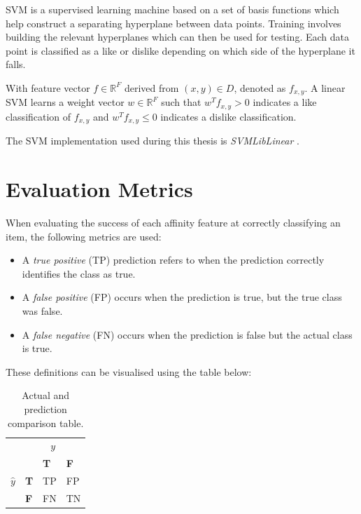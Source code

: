 SVM is a supervised learning machine based on a set of basis functions which help construct 
a separating hyperplane between data points. Training involves building the relevant hyperplanes which can then be used for testing. 
Each data point is classified as a like or dislike depending on which side of the hyperplane it falls.

With feature vector $f \in \mathbb{R}^F$ derived from $(x,y) \in D$, denoted as $f_{x,y}$. A linear SVM learns a weight vector $w \in \mathbb{R}^F$
such that $w^T f_{x,y} > 0$ indicates a like classification of $f_{x,y}$ and $w^T f_{x,y} \leq 0$ indicates a dislike classification.

The SVM implementation used during this thesis is \emph{SVMLibLinear} \cite{cjlin}.

\section{Evaluation Metrics}
\label{sec:notation}

When evaluating the success of each affinity feature at correctly classifying an item, the following metrics are used:

\begin{itemize}
\item A \emph{true positive} (TP) prediction refers to when the prediction correctly identifies the class as true. 
\item A \emph{false positive} (FP) occurs when the prediction is true, but the true class was false.
\item A \emph{false negative} (FN) occurs when the prediction is false but the actual class is true.
\end{itemize}

These definitions can be visualised using the table below:

\begin{table}[tbh!]
\centering
\begin{tabular}{r|l|l|l|}
\multicolumn{1}{r}{}
 &  \multicolumn{3}{c}{$y$} \\
 \cline{2-4}
& & \textbf{T} & \textbf{F} \\ 
\cline{2-4}
$\hat{y}$ & \textbf{T} & TP & FP \\
\cline{2-4}
& \textbf{F} & FN & TN \\
\cline{2-4}
\end{tabular}
\caption{Actual and prediction comparison table.}
	\label{tab:revpol}
\end{table}

